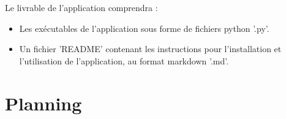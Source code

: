 \documentclass[12pt]{article}
\begin{document}
    Le livrable de l'application comprendra :

    \begin{itemize}
        \item Les exécutables de l'application sous forme de fichiers python '.py'.
        \item Un fichier 'README' contenant les instructions pour l'installation et 
            l'utilisation de l'application, au format markdown '.md'.
    \end{itemize}

    \section{Planning}
\end{document}
